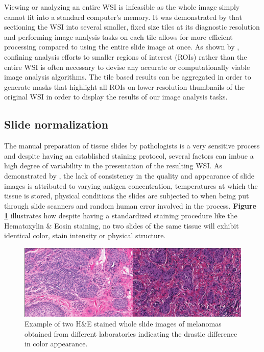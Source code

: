 \documentclass{l4proj}
\begin{document}
Viewing or analyzing an entire WSI is infeasible as the whole image simply cannot fit into a standard computer's memory. It was demonstrated by \cite{wang2012managing} that sectioning the WSI into several smaller, fixed size tiles at its diagnostic resolution and performing image analysis tasks on each tile allows for more efficient processing compared to using the entire slide image at once. As shown by \cite{aeffner2019introduction}, confining analysis efforts to smaller regions of interest (ROIs) rather than the entire WSI is often necessary to devise any accurate or computationally viable image analysis algorithms. The tile based results can be aggregated in order to generate masks that highlight all ROIs on lower resolution thumbnails of the original WSI in order to display the results of our image analysis tasks. 

\subsection{Slide normalization} \label{slide-normalization-background}
The manual preparation of tissue slides by pathologists is a very sensitive process and despite having an established staining protocol, several factors can imbue a high degree of variability in the presentation of the resulting WSI. As demonstrated by \cite{anghel2019high}, the lack of consistency in the quality and appearance of slide images is attributed to varying antigen concentration, temperatures at which the tissue is stored, physical conditions the slides are subjected to when being put through slide scanners and random human error involved in the process. \textbf{Figure \ref{fig:he-stain-difference}} illustrates how despite having a standardized staining procedure like the Hematoxylin \& Eosin staining, no two slides of the same tissue will exhibit identical color, stain intensity or physical structure.   

\begin{figure}[h]
\centering
\includegraphics[scale=0.7]{images/stain-difference-slide.png}
\caption{Example of two H\&E stained whole slide images of melanomas obtained from different laboratories indicating the drastic difference in color appearance.}
\label{fig:he-stain-difference}
\end{figure}
\end{document}
